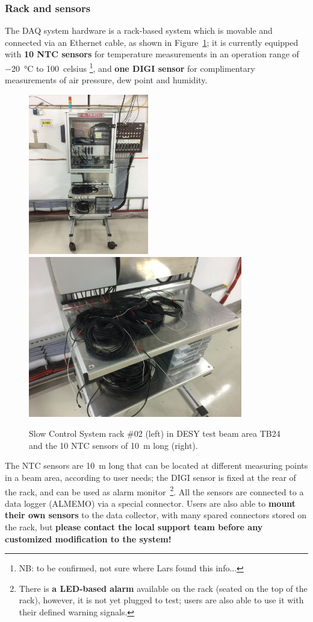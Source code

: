 \documentclass[a4paper,12pt]{scrartcl}
\begin{document}
\subsubsection*{Rack and sensors}
The DAQ system hardware is a rack-based system which is movable and connected via an Ethernet cable, as shown in Figure~\ref{fig:sc-rack}; it is currently equipped with \textbf{10 NTC sensors} for temperature measurements in an operation range of \SI{-20}{\celsius} to \SI{+100}{celsius} \footnote{NB: to be confirmed, not sure where Lars found this info...}, and \textbf{one DIGI sensor} for complimentary measurements of air pressure, dew point and humidity.
\begin{figure}[!ht]
  \centering
  \includegraphics[height=7cm]{Rackganz.jpg}%
  \includegraphics[height=7cm]{Sensoren.jpg}
\caption{Slow Control System rack \#02 (left) in DESY test beam area TB24 and the 10 NTC sensors of \SI{10}{m} long (right).}
\label{fig:sc-rack}
\end{figure}

The NTC sensors are \SI{10}{m} long that can be located at different measuring points in a beam area, according to user needs; the DIGI sensor is fixed at the rear of the rack, and can be used as alarm monitor~\footnote{There is \textbf{a LED-based alarm} available on the rack (seated on the top of the rack), however, it is not yet plugged to test; users are also able to use it with their defined warning signals.}. All the sensors are connected to a data logger (ALMEMO) via a special connector. Users are also able to \textbf{mount their own sensors} to the data collector, with many spared connectors stored on the rack, but \textbf{please contact the local support team before any customized modification to the system!}
\end{document}
